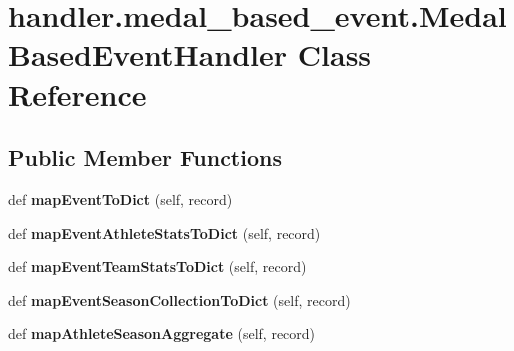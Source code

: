 \hypertarget{classhandler_1_1medal__based__event_1_1_medal_based_event_handler}{}\section{handler.\+medal\+\_\+based\+\_\+event.\+Medal\+Based\+Event\+Handler Class Reference}
\label{classhandler_1_1medal__based__event_1_1_medal_based_event_handler}
\subsection*{Public Member Functions}
\begin{DoxyCompactItemize}
\item 
\mbox{\label{classhandler_1_1medal__based__event_1_1_medal_based_event_handler_ac7365cc1743eb4fbbf6a031b42491604}} 
def {\bfseries map\+Event\+To\+Dict} (self, record)
\item 
\mbox{\label{classhandler_1_1medal__based__event_1_1_medal_based_event_handler_a24c5e875bba6ff38fe3cf841fe236d68}} 
def {\bfseries map\+Event\+Athlete\+Stats\+To\+Dict} (self, record)
\item 
\mbox{\label{classhandler_1_1medal__based__event_1_1_medal_based_event_handler_a97e6b6b11b72b27be1cc0416a0eaa6e0}} 
def {\bfseries map\+Event\+Team\+Stats\+To\+Dict} (self, record)
\item 
\mbox{\label{classhandler_1_1medal__based__event_1_1_medal_based_event_handler_ab259dbc41e43904e443d5f0ef58a3770}} 
def {\bfseries map\+Event\+Season\+Collection\+To\+Dict} (self, record)
\item 
\mbox{\label{classhandler_1_1medal__based__event_1_1_medal_based_event_handler_abfd5c8c4402b050b89bb57bead849e3b}} 
def {\bfseries map\+Athlete\+Season\+Aggregate} (self, record)
\item 
\mbox{\label{classhandler_1_1medal__based__event_1_1_medal_based_event_handler_aa86f233489cc340ef75b448d93c1f5bd}} 

\end{DoxyCompactItemize}
